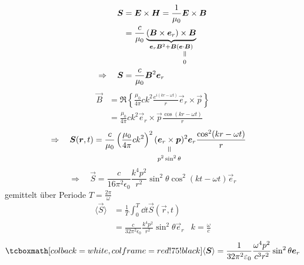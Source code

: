 \begin{align*}
\vec{S} &= \vec{E} \times \vec{H} = \frac{1}{\mu_0} \vec{E} \times \vec{B}\\
&= \frac{c}{\mu_0} \ub{(\vec{B} \times \vec{e}_r) \times \vec{B}}_{\vec{e}_r \vec{B}^2 + \vec{B} (\equalto{\vec{e}\cdot \vec{B}}{0})}\\
\Rightarrow \quad \vec{S} &= \frac{c}{\mu_0} \vec{B}^2 \vec{e}_r
\end{align*}
\begin{align*}
\vec{B} &= \Re \left\{ \frac{\mu_0}{4 \pi} c k^2 \frac{e^{i(kr-\omega t)}}{r} \vec{e}_r \times \vec{p} \right\}\\
&= \frac{\mu_0}{4 \pi} ck^2 \vec{e}_r \times \vec{p} \frac{\cos(kr - \omega t)}{r}
\end{align*}
\begin{align*}
\Rightarrow \quad \vec{S}(\vec{r},t) &= \frac{c}{\mu_0} \left(\frac{\mu_0}{4 \pi} ck^2\right)^2 (\equalto{\vec{e}_r \times \vec{p}}{p^2 \sin^2 \theta} )^2 \vec{e}_r \frac{\cos^2(kr - \omega t)}{r}
\end{align*}
\begin{equation*}
\Rightarrow \quad \vec{S} = \frac{c}{16 \pi^2 \epsilon_0} \frac{k^4 p^2}{r^2} \sin^2 \theta \cos^2(k t - \omega t) \vec{e}_r
\end{equation*}
gemittelt über Periode $ T = \frac{2 \pi}{\omega} $
\begin{align*}
\langle \vec{S} \rangle &= \frac{1}{T} \int_{0}^{T} \dd t \vec{S}(\vec{r},t)\\
&= \frac{c}{32 \pi^2 \epsilon_0} \frac{k^4 p^2}{r^2} \sin^2 \theta \vec{e}_r & k = \frac{\omega}{c}
\end{align*}
\begin{equation*}
\rmbox{\langle \vec{S} \rangle = \frac{1}{32 \pi^2 \epsilon_0} \frac{\omega^4 p^2}{c^3 r^2} \sin^2 \theta \vec{e}_r}
\end{equation*}
